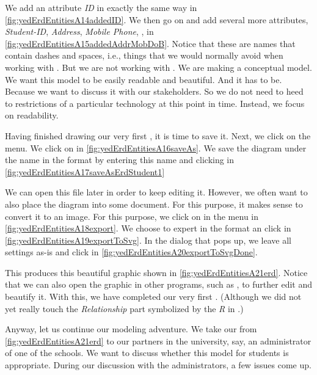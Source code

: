 We add an attribute \emph{ID} in exactly the same way in \cref{fig:yedErdEntitiesA14addedID}.
We then go on and add several more attributes, \emph{Student-ID}, \emph{Address}, \emph{Mobile Phone}, \emph{}, in \cref{fig:yedErdEntitiesA15addedAddrMobDoB}.
Notice that these are names that contain dashes and spaces, i.e., things that we would normally avoid when working with \sql.
But we are not working with \sql.
We are making a conceptual model.
We want this model to be easily readable and beautiful.
And it has to be.
Because we want to discuss it with our stakeholders.
So we do not need to heed to restrictions of a particular technology at this point in time.
Instead, we focus on readability.

Having finished drawing our very first , it is time to save it.
Next, we click on the  menu.
We click on  in \cref{fig:yedErdEntitiesA16saveAs}.
We save the diagram under the name  in the  format by entering this name and clicking  in \cref{fig:yedErdEntitiesA17saveAsErdStudent1}

We can open this file later in order to keep editing it.
However, we often want to also place the diagram into some document.
For this purpose, it makes sense to convert it to an image.
For this purpose, we click on  in the  menu in \cref{fig:yedErdEntitiesA18export}.
We choose to expert in the  format an click  in \cref{fig:yedErdEntitiesA19exportToSvg}.
In the dialog that pops up, we leave all settings as-is and click  in \cref{fig:yedErdEntitiesA20exportToSvgDone}.

This produces this beautiful  graphic shown in \cref{fig:yedErdEntitiesA21erd}.
Notice that we can also open the  graphic in other programs, such as \inkscape, to further edit and beautify it.
With this, we have completed our very first .
(Although we did not yet really touch the \emph{Relationship} part symbolized by the \emph{R} in .)

%
%
Anyway, let us continue our modeling adventure.
We take our  from \cref{fig:yedErdEntitiesA21erd} to our partners in the university, say, an administrator of one of the schools.
We want to discuss whether this model for students is appropriate.
During our discussion with the administrators, a few issues come up.

